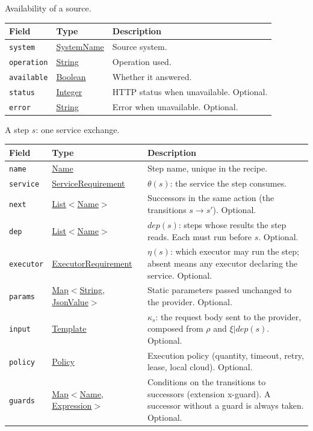 \documentclass[a4paper]{arrowhead}
\newcommand{\mref}[1]{{\textcolor{ArrowheadPurple}{\hyperref[sec:model:#1]{#1}}}}
\newcommand{\pref}[1]{{\textcolor{ArrowheadGrey}{\hyperref[sec:model:primitives:#1]{#1}}}}
\begin{document}
Availability of a source.

{\small
\begin{longtable}{|p{3.9cm}|p{4.4cm}|p{7.5cm}|}

\hline
\rowcolor{gray!33} Field & Type & Description \\ \hline
\endhead
\texttt{system} & \pref{SystemName} & Source system. \\ \hline
\texttt{operation} & \pref{String} & Operation used. \\ \hline
\texttt{available} & \pref{Boolean} & Whether it answered. \\ \hline
\texttt{status} & \pref{Integer} & HTTP status when unavailable. Optional. \\ \hline
\texttt{error} & \pref{String} & Error when unavailable. Optional. \\ \hline
\end{longtable}
}

A step $s$: one service exchange.

{\small
\begin{longtable}{|p{3.9cm}|p{4.4cm}|p{7.5cm}|}

\hline
\rowcolor{gray!33} Field & Type & Description \\ \hline
\endhead
\texttt{name} & \pref{Name} & Step name, unique in the recipe. \\ \hline
\texttt{service} & \mref{ServiceRequirement} & $\theta(s)$: the service the step consumes. \\ \hline
\texttt{next} & \pref{List}$<$\pref{Name}$>$ & Successors in the same action (the transitions $s \rightarrow s'$). Optional. \\ \hline
\texttt{dep} & \pref{List}$<$\pref{Name}$>$ & $dep(s)$: steps whose results the step reads. Each must run before $s$. Optional. \\ \hline
\texttt{executor} & \mref{ExecutorRequirement} & $\eta(s)$: which executor may run the step; absent means any executor declaring the service. Optional. \\ \hline
\texttt{params} & \pref{Map}$<$\pref{String}, \pref{JsonValue}$>$ & Static parameters passed unchanged to the provider. Optional. \\ \hline
\texttt{input} & \pref{Template} & $\kappa_s$: the request body sent to the provider, composed from $\rho$ and $\xi|dep(s)$. Optional. \\ \hline
\texttt{policy} & \mref{Policy} & Execution policy (quantity, timeout, retry, lease, local cloud). Optional. \\ \hline
\texttt{guards} & \pref{Map}$<$\pref{Name}, \pref{Expression}$>$ & Conditions on the transitions to successors (extension x-guard). A successor without a guard is always taken. Optional. \\ \hline
\end{longtable}
}
\end{document}
